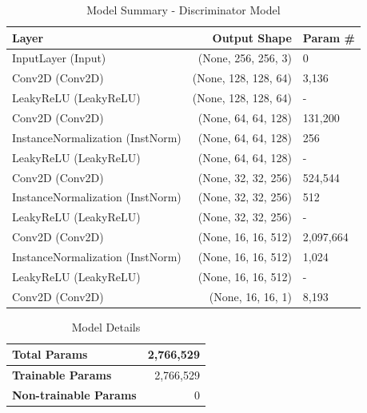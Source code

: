 \documentclass[12pt,DIV14,BCOR12mm,a4paper,footinclude=false,headinclude,parskip=half-,twoside,openright,cleardoublepage=empty,toc=index,bibliography=totoc,listof=totoc]{scrreprt}
\numberwithin{equation}{chapter}
\begin{document}
\begin{table}[h]
    \centering
    \caption{Model Summary - Discriminator Model}
    \label{tab:discriminator_model_summary}
    \begin{tabular}{lrl}
        \toprule
        \textbf{Layer} & \textbf{Output Shape} & \textbf{Param \#} \\ 
        \midrule
        InputLayer (Input) & (None, 256, 256, 3)    & 0          \\ 
        Conv2D (Conv2D)    & (None, 128, 128, 64)   & 3,136      \\ 
        LeakyReLU (LeakyReLU) & (None, 128, 128, 64)   & -          \\ 
        Conv2D (Conv2D)    & (None, 64, 64, 128)    & 131,200    \\ 
        InstanceNormalization (InstNorm) & (None, 64, 64, 128)  & 256        \\ 
        LeakyReLU (LeakyReLU) & (None, 64, 64, 128)    & -          \\ 
        Conv2D (Conv2D)    & (None, 32, 32, 256)    & 524,544    \\ 
        InstanceNormalization (InstNorm) & (None, 32, 32, 256)  & 512        \\ 
        LeakyReLU (LeakyReLU) & (None, 32, 32, 256)    & -          \\ 
        Conv2D (Conv2D)    & (None, 16, 16, 512)    & 2,097,664  \\ 
        InstanceNormalization (InstNorm) & (None, 16, 16, 512)  & 1,024      \\ 
        LeakyReLU (LeakyReLU) & (None, 16, 16, 512)    & -          \\ 
        Conv2D (Conv2D)    & (None, 16, 16, 1)      & 8,193      \\ 
        \bottomrule
    \end{tabular}
\end{table}


\begin{table}[h]
    \centering
    \caption{Model Details}
    \label{tab:model_details_disc}
    \begin{tabular}{lr}
        \toprule
        \textbf{Total Params}          & 2,766,529 \\ 
        \midrule
        \textbf{Trainable Params}      & 2,766,529 \\ 
        \midrule
        \textbf{Non-trainable Params}  & 0         \\ 
        \bottomrule
    \end{tabular}
\end{table}
\end{document}
